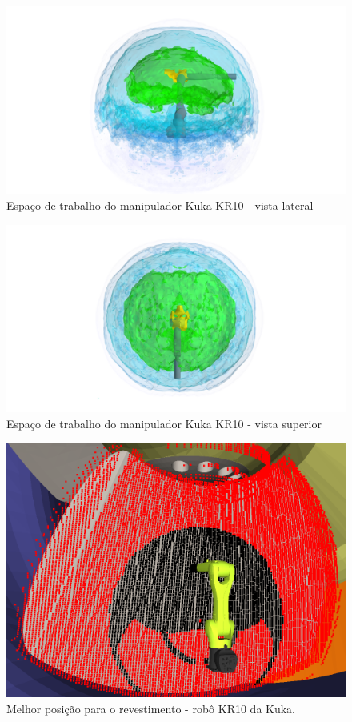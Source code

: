\begin{figure}[h!]	
	\includegraphics[width=\columnwidth]{figs/bighatch/kr10_front.png}
	\caption{Espaço de trabalho do manipulador Kuka KR10 - vista lateral}
	\label{fig::kr10cin1}
\end{figure}

\begin{figure}[h!]	
	\includegraphics[width=\columnwidth]{figs/bighatch/kr10_top.png}
	\caption{Espaço de trabalho do manipulador Kuka KR10 - vista superior}
	\label{fig::kr10cin2}
\end{figure}

\begin{figure}[h!]	
	\includegraphics[width=\columnwidth]{figs/bighatch/kr10_bestpos.png}
	\caption{Melhor posição para o revestimento - robô KR10 da Kuka.}
	\label{fig::kr10bestpos}
\end{figure}



